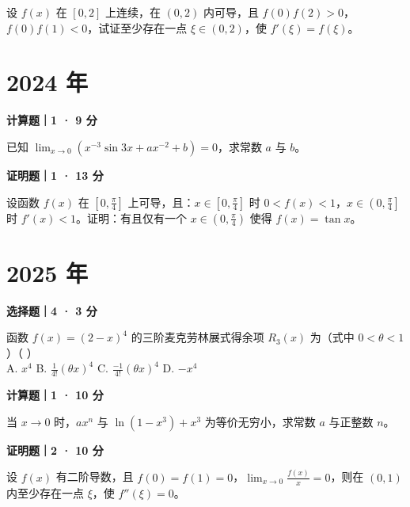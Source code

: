 设 $f(x)$ 在 $[0, 2]$ 上连续，在 $(0, 2)$ 内可导，且 $f(0)f(2) > 0$，$f(0)f(1) < 0$，试证至少存在一点 $\xi \in (0, 2)$，使 $f'(\xi) = f(\xi)$。


\section*{2024 年}


\textbf{计算题｜1 · 9 分}

已知 $\lim_{x \to 0}(x^{-3}\sin 3x + ax^{-2} + b) = 0$，求常数 $a$ 与 $b$。


\textbf{证明题｜1 · 13 分}

设函数 $f(x)$ 在 $\left[0, \frac{\pi}{4}\right]$ 上可导，且：$x \in \left[0, \frac{\pi}{4}\right]$ 时 $0 < f(x) < 1$，$x \in \left(0, \frac{\pi}{4}\right]$ 时 $f'(x) < 1$。证明：有且仅有一个 $x \in \left(0, \frac{\pi}{4}\right)$ 使得 $f(x) = \tan x$。


\section*{2025 年}


\textbf{选择题｜4 · 3 分}

函数 $f(x) = (2-x)^4$ 的三阶麦克劳林展式得余项 $R_3(x)$ 为（式中 $0 < \theta < 1$）（ \quad ）\\
A. $x^4$ \quad B. $\frac{1}{4!}(\theta x)^4$ \quad C. $\frac{-1}{4!}(\theta x)^4$ \quad D. $-x^4$


\textbf{计算题｜1 · 10 分}

当 $x \to 0$ 时，$ax^n$ 与 $\ln(1-x^3) + x^3$ 为等价无穷小，求常数 $a$ 与正整数 $n$。


\textbf{证明题｜2 · 10 分}

设 $f(x)$ 有二阶导数，且 $f(0) = f(1) = 0$，$\lim_{x \to 0} \frac{f(x)}{x} = 0$，则在 $(0, 1)$ 内至少存在一点 $\xi$，使 $f''(\xi) = 0$。

